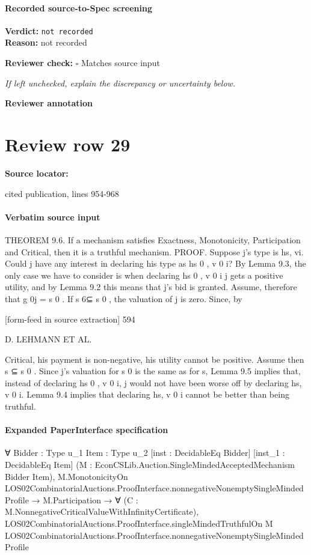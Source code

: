 \documentclass[10pt]{article}
\newcommand{\reviewerbox}{%
  \par\noindent\fbox{\parbox{0.96\linewidth}{\rule{0pt}{0.38in}}}\par
}
\newcommand{\reviewmatch}[1]{%
  \par\noindent\textbf{Reviewer check:} $\square$\; #1\par
  \noindent\emph{If left unchecked, explain the discrepancy or uncertainty below.}\par
}
\begin{document}
\paragraph{Recorded source-to-Spec screening}
\textbf{Verdict:} \texttt{not recorded}
\\
\textbf{Reason:} not recorded
\reviewmatch{Matches source input}
\noindent\textbf{Reviewer annotation}\par
\reviewerbox
\clearpage
\hypertarget{source-claim-182799567034cff6}{}
\section*{Review row 29}
\textbf{Source locator:} {\footnotesize\raggedright cited publication, lines 954-\allowbreak{}968\par}
\paragraph{Verbatim source input}
\begin{ReviewVerbatim}
THEOREM 9.6. If a mechanism satisfies Exactness, Monotonicity, Participation
and Critical, then it is a truthful mechanism.
PROOF. Suppose j’s type is hs, vi. Could j have any interest in declaring his
type as hs 0 , v 0 i? By Lemma 9.3, the only case we have to consider is when declaring
hs 0 , v 0 i j gets a positive utility, and by Lemma 9.2 this means that j’s bid is granted.
Assume, therefore that g 0j = s 0 . If s 6⊆ s 0 , the valuation of j is zero. Since, by


[form-feed in source extraction]
594

D. LEHMANN ET AL.

Critical, his payment is non-negative, his utility cannot be positive. Assume then
s ⊆ s 0 . Since j’s valuation for s 0 is the same as for s, Lemma 9.5 implies that,
instead of declaring hs 0 , v 0 i, j would not have been worse off by declaring hs, v 0 i.
Lemma 9.4 implies that declaring hs, v 0 i cannot be better than being truthful.
\end{ReviewVerbatim}


\paragraph{Expanded PaperInterface specification}
\begin{ReviewVerbatim}
∀ {Bidder : Type u_1} {Item : Type u_2} [inst : DecidableEq Bidder] [inst_1 : DecidableEq Item]
  (M : EconCSLib.Auction.SingleMindedAcceptedMechanism Bidder Item),
  M.MonotonicityOn LOS02CombinatorialAuctions.ProofInterface.nonnegativeNonemptySingleMindedProfile →
    M.Participation →
      ∀ (C : M.NonnegativeCriticalValueWithInfinityCertificate),
        LOS02CombinatorialAuctions.ProofInterface.singleMindedTruthfulOn M
          LOS02CombinatorialAuctions.ProofInterface.nonnegativeNonemptySingleMindedProfile
\end{ReviewVerbatim}
\end{document}
